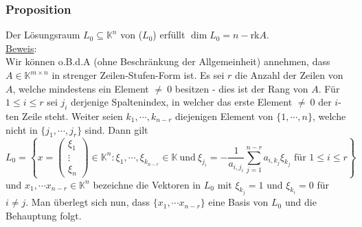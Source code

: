 \subsubsection{Proposition}
\label{2.6.3}
Der Lösungsraum $L_0\subseteq\mathbb{K}^n$ von ($L_0$) erfüllt $\dim L_0=n-$rk$A$.\\
\underline{Beweis}:\\
Wir können o.B.d.A (ohne Beschränkung der Allgemeinheit) annehmen, dass $A\in\mathbb{K}^{m\times n}$ in strenger Zeilen-Stufen-Form ist.  Es sei $r$ die Anzahl der Zeilen von $A$, welche mindestens ein Element $\not=\ 0$ besitzen - dies ist der Rang von $A$.  Für $1\leq i\leq r$ sei $j_i$ derjenige Spaltenindex, in welcher das erste Element $\not=\ 0$ der $i$-ten Zeile steht.  Weiter seien $k_1,\cdots ,k_{n-r}$ diejenigen Element von $\{1,\cdots ,n\}$, welche nicht in $\{j_1,\cdots ,j_r\}$ sind.  Dann gilt 
\[L_0=\left\{x=\begin{pmatrix}\xi _1\\ \vdots \\ \xi_n\end{pmatrix}\in\mathbb{K}^n:\xi _1,\cdots ,\xi _{k_{n-r}} \in\mathbb{K}\ \mathrm{und}\ \xi _{j_i}=-\frac{1}{a_{i,j_i}}\sum_{j=1}^{n-r} a_{i,k_j} \xi _{k_j}\text{ für }1\leq i\leq r\right\}\]
und $x_1,\cdots x_{n-r}\in\mathbb{K}^n$ bezeichne die Vektoren in $L_0$ mit $\xi _{k_j}=1$ und $\xi _{k_i}=0$ für $i\not= j$.  Man überlegt sich nun, dass $\{x_1,\cdots x_{n-r}\}$ eine Basis von $L_0$ und die Behauptung folgt.
